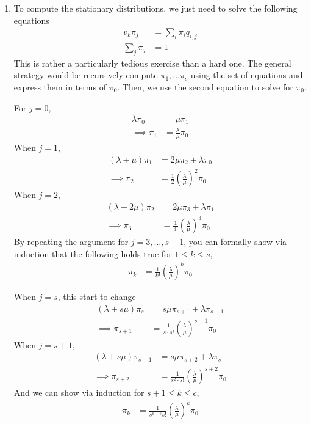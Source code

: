\documentclass[11pt]{article}
\begin{document}
\begin{enumerate}
\item To compute the stationary distributions, we just need to solve the following equations
\begin{align*}
	v_k \pi_j &= \sum_i \pi_i q_{i, j} \\
	\sum_j \pi_j &= 1
\end{align*}
This is rather a particularly tedious exercise than a hard one. The general strategy would be recursively compute $\pi_1, \dots \pi_{c}$ using the set of equations and express them in terms of $\pi_0$. Then, we use the second equation to solve for $\pi_0$.

For $j = 0$,
\begin{align*}
	\lambda \pi_0 &= \mu \pi_1 \\
	\implies \pi_1 &= \frac{\lambda}{\mu} \pi_0
\end{align*}
When $j = 1$,
\begin{align*}
	(\lambda + \mu) \pi_1 &= 2 \mu \pi_2 + \lambda \pi_0 \\
	\implies \pi_2 &= \frac{1}{2} \left( \frac{\lambda}{\mu} \right)^2 \pi_0
\end{align*}
When $j =2$,
\begin{align*}
	(\lambda + 2 \mu) \pi_2 &= 2 \mu \pi_3 + \lambda \pi_1 \\
	\implies \pi_3 &= \frac{1}{3!} \left( \frac{\lambda}{\mu} \right)^3 \pi_0
\end{align*}
By repeating the argument for $j = 3, \dots, s - 1$, you can formally show via induction that the following holds true for $1 \leq k \leq s$,
\begin{align*}
	\pi_k &= \frac{1}{k!} \left(\frac{\lambda}{\mu}\right)^k \pi_0
\end{align*}

When $j = s$, this start to change
\begin{align*}
	(\lambda + s \mu) \pi_s &= s \mu \pi_{s+1} + \lambda \pi_{s-1} \\
	\implies \pi_{s+1} &= \frac{1}{s \cdot s!} \left(\frac{\lambda}{\mu}\right)^{s+1} \pi_0
\end{align*}
When $j = s + 1$,
\begin{align*}
	(\lambda + s \mu) \pi_{s+1} &= s \mu \pi_{s + 2} + \lambda \pi_s \\
	\implies \pi_{s + 2} &= \frac{1}{s^2 \cdot s!} \left(\frac{\lambda}{\mu}\right)^{s+2} \pi_0
\end{align*}
And we can show via induction for $s + 1 \leq k \leq c$,
\begin{align*}
	\pi_k &= \frac{1}{s^{k-s} s!} \left(\frac{\lambda}{\mu}\right)^k \pi_0
\end{align*}


\end{enumerate}
\end{document}
